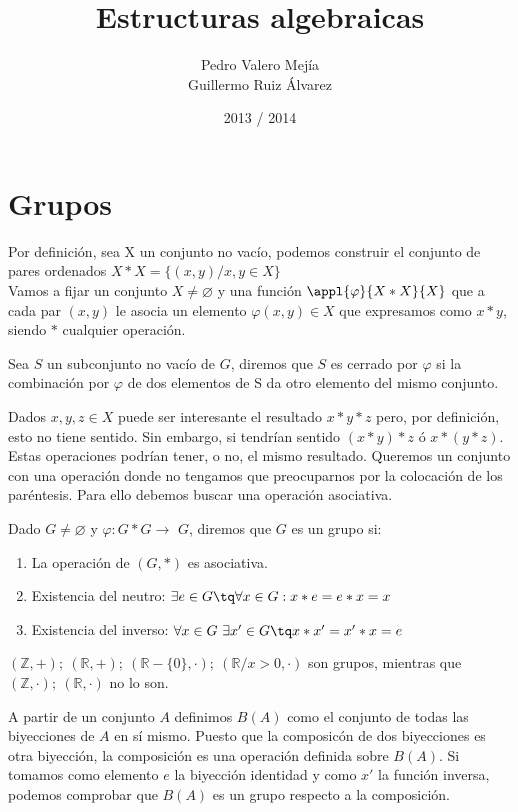 \documentclass[a4paper,10pt]{apuntes}
\title{Estructuras algebraicas}
\author{Pedro Valero Mejía \\ Guillermo Ruiz Álvarez}
\date{2013 / 2014}
\begin{document}
\maketitle
\tableofcontents
\newpage

\section{Grupos}
 
 Por definición, sea X un conjunto no vacío, podemos construir el conjunto de pares ordenados $X\ast X=\{(x,y)/x,y\in X\}$\\
 Vamos a fijar un conjunto $X\neq \varnothing$  y una función $\appl{\varphi}{X\ast X}{X}$ que a cada par $(x,y)$ le asocia un elemento $\varphi (x,y) \in X$ que expresamos como $x\ast y$, siendo $\ast$ cualquier operación.
 \begin{defn}
  Sea $S$ un subconjunto no vacío de $G$, diremos que $S$ es cerrado por $\varphi$  si la combinación por $\varphi$  de dos elementos de S da otro elemento del mismo conjunto.
 \end{defn}
 
 Dados $x,y,z \in X$ puede ser interesante el resultado $x\ast y\ast z$ pero, por definición, esto no tiene sentido. Sin embargo, si tendrían 
 sentido $(x\ast y)\ast z$ ó $x\ast (y\ast z)$. Estas operaciones podrían tener, o no, el mismo resultado. Queremos un conjunto con una operación 
 donde no tengamos que preocuparnos por la colocación de los paréntesis. Para ello debemos buscar una operación asociativa.
 
 \begin{defn}[Grupo]
 Dado $G\neq \varnothing$  y $\varphi: G*G \longrightarrow$  $G$, diremos que $G$ es un grupo si:
 \begin{enumerate}
  \item La operación de {$(G,*)$ es asociativa.}
  \item Existencia del neutro: {$\exists e \in G \tq \forall x\in G: x\ast e=e\ast x=x$}
  \item Existencia del inverso: {$\forall x \in G\  \exists  x'  \in G \tq x*x'=x'*x=e$}
 \end{enumerate}
 \end{defn}

 \begin{example}
   $(\mathbb{Z}, +);\ (\mathbb{R}, +);\ (\mathbb{R}-\{ 0\} , \cdot);\ (\mathbb{R}/x>0, \cdot)$ son grupos, mientras que 
  $(\mathbb{Z}, \cdot);\ (\mathbb{R}, \cdot)$ no lo son.
   
   A partir de un conjunto $A$ definimos $B(A)$ como el conjunto de todas las biyecciones de $A$ en sí mismo. Puesto que la composicón 
   de dos biyecciones es otra biyección, la composición es una operación definida sobre $B(A)$. Si tomamos como elemento $e$ la biyección 
   identidad y como $x'$ la función inversa, podemos comprobar que $B(A)$ es un grupo respecto a la composición.
 \end{example}
  
\end{document}
